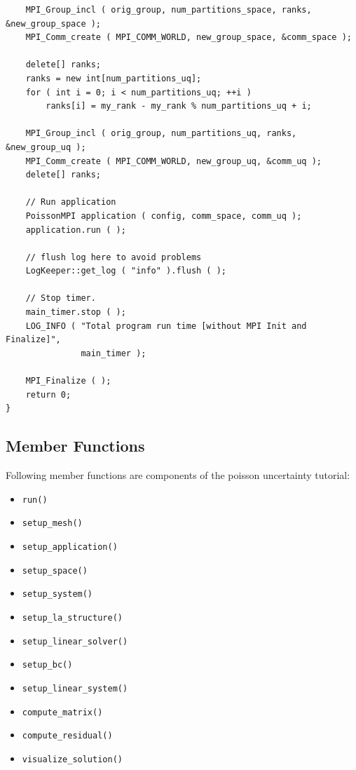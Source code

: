 \documentclass{article}
\begin{document}
\begin{lstlisting}
    MPI_Group_incl ( orig_group, num_partitions_space, ranks, &new_group_space );
    MPI_Comm_create ( MPI_COMM_WORLD, new_group_space, &comm_space );

    delete[] ranks;
    ranks = new int[num_partitions_uq];
    for ( int i = 0; i < num_partitions_uq; ++i )
        ranks[i] = my_rank - my_rank % num_partitions_uq + i;

    MPI_Group_incl ( orig_group, num_partitions_uq, ranks, &new_group_uq );
    MPI_Comm_create ( MPI_COMM_WORLD, new_group_uq, &comm_uq );
    delete[] ranks;

    // Run application
    PoissonMPI application ( config, comm_space, comm_uq );
    application.run ( );

    // flush log here to avoid problems
    LogKeeper::get_log ( "info" ).flush ( );

    // Stop timer.
    main_timer.stop ( );
    LOG_INFO ( "Total program run time [without MPI Init and Finalize]",
               main_timer );

    MPI_Finalize ( );
    return 0;
}
\end{lstlisting}

\subsection{Member Functions}
\label{sec:program:subsec:member_func}

Following member functions are components of the poisson uncertainty tutorial:

\begin{itemize}
\item{\texttt{run()}}
\item{\texttt{setup\_mesh()}}
\item{\texttt{setup\_application()}}
\item{\texttt{setup\_space()}}
\item{\texttt{setup\_system()}}
\item{\texttt{setup\_la\_structure()}}
\item{\texttt{setup\_linear\_solver()}}
\item{\texttt{setup\_bc()}}
\item{\texttt{setup\_linear\_system()}}
\item{\texttt{compute\_matrix()}}
\item{\texttt{compute\_residual()}}
\item{\texttt{visualize\_solution()}}
\end{itemize}
\end{document}
